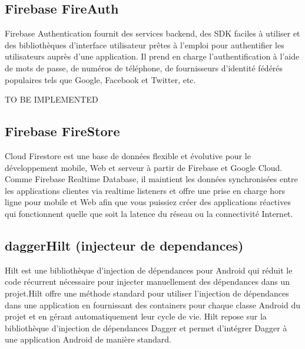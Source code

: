 \subsection{Firebase FireAuth}
Firebase Authentication fournit des services backend, des SDK faciles à utiliser et des bibliothèques d'interface utilisateur prêtes à l'emploi pour authentifier les utilisateurs auprès d'une application. Il prend en charge l'authentification à l'aide de mots de passe, de numéros de téléphone, de fournisseurs d'identité fédérés populaires tels que Google, Facebook et Twitter, etc.

TO BE IMPLEMENTED
\subsection{Firebase FireStore}
Cloud Firestore est une base de données flexible et évolutive pour le développement mobile, Web et serveur à partir de Firebase et Google Cloud. Comme Firebase Realtime Database, il maintient les données synchronisées entre les applications clientes via realtime listeners et offre une prise en charge hors ligne pour mobile et Web afin que vous puissiez créer des applications réactives qui fonctionnent quelle que soit la latence du réseau ou la connectivité Internet.
\subsection{daggerHilt (injecteur de dependances)}
Hilt est une bibliothèque d'injection de dépendances pour Android qui réduit le code récurrent nécessaire pour injecter manuellement des dépendances dans un projet.Hilt offre une méthode standard pour utiliser l'injection de dépendances dans une application en fournissant des containers pour chaque classe Android du projet et en gérant automatiquement leur cycle de vie. 
Hilt repose sur la bibliothèque d'injection de dépendances Dagger et permet d'intégrer Dagger à une application Android de manière standard.

